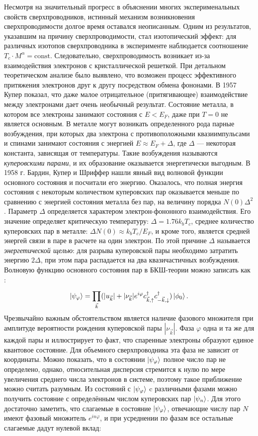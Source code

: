 Несмотря на значительный прогресс в объяснении многих эксперименальных свойств сверхпроводников, истинный механизм возникновения сверхпроводимости долгое время оставался неописанным. Одним из результатов, указавшим на причину сверхпроводимости, стал изотопический эффект: для различных изотопов сверхпроводника в эксперименте наблюдается соотношение $T_c \cdot M^{\alpha}=\text{const}$. Следовательно, сверхпроводимость возникает из-за взаимодействия электронов с кристаллической решеткой. При детальном теоретическом анализе было выявлено, что возможен процесс эффективного притяжения электронов друг к другу посредством обмена фононами. В 1957 Купер \cite{CooperPairs} показал, что даже малое отрицательное (притягивающее) взаимодействие между электронами дает очень необычный результат. Состояние металла, в котором все электроны занимают состояния с $E<E_F$, даже при $T=0$ не является основным. В металле могут возникать определенного рода парные возбуждения, при которых два электрона с противоположными квазиимпульсами и спинами занимают состояния с энергией $E\approx E_F\! +\! \Delta$, где $\Delta$ --- некоторая константа, зависящая от температуры. Такие возбуждения называются \textit{куперовскими парами}, и их образование оказывается энергетически выгодным.  В 1958 г. Бардин, Купер и Шриффер \cite{Bardeen} нашли явный вид волновой функции основного состояния  и посчитали его энергию. Оказалось, что полная энергия состояния с некоторым количеством куперовских пар оказывается меньше по сравнению с энергией состояния металла без пар, на величину порядка $N(0)\Delta^2$. Параметр $\Delta$ определяется характером электрон-фононного взаимодействия. Его значение определяет критическую температуру: $\Delta = 1.76 k_b T_c$, среднее количество куперовских пар в металле: $\Delta N(0) \approx k_b T_c/E_F$, и кроме того, является средней энергей связи в паре в расчете на один электрон. По этой причине $\Delta$ называется \textit{энергетической щелью}: для разрыва куперовской пары необходимо затратить энергию $2\Delta$, при этом пара распадается на два квазичастичных возбуждения. Волновую функцию основного состояния пар в БКШ-теории можно записать как \cite{Tinkham}:
\begin{equation}
\ket{\psi_\varphi} = \prod_{\vec{k}}^{}(|u_{\vec{k}}|+|\nu_{\vec{k}}|e^{i\varphi}c^\dag_{\vec{k},\uparrow}c^\dagger_{-\vec{k}, \downarrow})\ket{\phi_0}.
\end{equation}  
Чрезвычайно важным обстоятельством является наличие фазового множителя при амплитуде вероятности рождения куперовской пары $|\nu_{\vec{k}}|$. Фаза $\varphi$ одна и та же для каждой пары и иллюстрирует то факт, что спаренные электроны образуют единое квантовое состояние. Для объемного сверхпроводника эта фаза не зависит от координаты. Можно показать, что в состоянии $\ket{\psi_\varphi}$ полное число пар не определено, однако, относительная дисперсия стремится к нулю по мере увеличения среднего числа электронов в системе, поэтому такое приближение можно считать разумным. Из состояний с $\ket{\psi_\varphi}$ c различными фазами можно получить состояние с определённым числом куперовских пар $\ket{\psi_n}$. Для этого достаточно заметить, что слагаемые в состояние $\ket{\psi_\varphi}$, отвечающие числу пар $N$ имеют фазовый множитель $e^{in{\varphi}}$, и при усреднении по фазам все остальные слагаемые дадут нулевой вклад:
